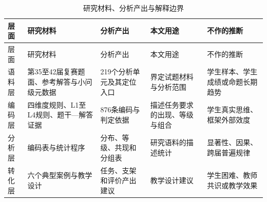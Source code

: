 \documentclass[
  12pt,
  a4paper]{ctexbook}
\begin{document}
\begin{longtable}[]{@{}
  >{\raggedright\arraybackslash}p{}
  >{\raggedright\arraybackslash}p{}
  >{\raggedright\arraybackslash}p{}
  >{\raggedright\arraybackslash}p{}
  >{\raggedright\arraybackslash}p{}@{}}
\caption{研究材料、分析产出与解释边界}\tabularnewline
\toprule\noalign{}
\rowcolor{ThesisPale}
\begin{minipage}[b]{\linewidth}\raggedright
层面
\end{minipage} & \begin{minipage}[b]{\linewidth}\raggedright
研究材料
\end{minipage} & \begin{minipage}[b]{\linewidth}\raggedright
分析产出
\end{minipage} & \begin{minipage}[b]{\linewidth}\raggedright
本文用途
\end{minipage} & \begin{minipage}[b]{\linewidth}\raggedright
不作的推断
\end{minipage} \\
\midrule\noalign{}
\endfirsthead
\toprule\noalign{}
\rowcolor{ThesisPale}
\begin{minipage}[b]{\linewidth}\raggedright
层面
\end{minipage} & \begin{minipage}[b]{\linewidth}\raggedright
研究材料
\end{minipage} & \begin{minipage}[b]{\linewidth}\raggedright
分析产出
\end{minipage} & \begin{minipage}[b]{\linewidth}\raggedright
本文用途
\end{minipage} & \begin{minipage}[b]{\linewidth}\raggedright
不作的推断
\end{minipage} \\
\midrule\noalign{}
\endhead
\bottomrule\noalign{}
\endlastfoot
语料层 & 第35至42届复赛题面、参考解答与小问级元数据 &
219个分析单元及其定位入口 & 界定试题材料与分析范围 &
学生样本、学生成绩或命题长期趋势 \\
编码层 & 四维度规则、L1至L4规则、题干---解答证据 & 876条编码与判定依据 &
描述任务要求的出现、等级与组合 & 学生真实思维、框架外部效度 \\
分析层 & 编码表与统计程序 & 分布、等级、共现和分组表 &
研究语料的描述统计 & 显著性、因果、跨届普遍规律 \\
转化层 & 六个典型案例与教学设计 & 任务、支架和评价产出建议 &
教学设计建议 & 学生困难、教师共识或教学效果 \\
\end{longtable}
\end{document}
